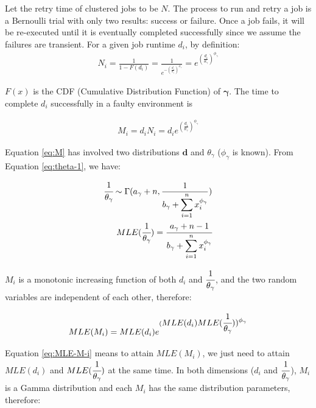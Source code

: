 \documentclass{IOS-Book-Article}
\begin{document}
Let the retry time of clustered jobs to be $N$. The process to run and retry a job is a Bernoulli trial with only two results: success or failure. Once a job fails, it will be re-executed until it is eventually completed successfully since we assume the failures are transient. For a given job runtime $d_i$, by definition:
\begin{eqnarray}
\displaystyle
N_i=\frac{1}{1-F(d_i)}=\frac{1}{e^{-(\displaystyle\frac{d_i}{\theta_{\gamma}})^{\phi_{\gamma}}}}=e^{(\displaystyle\frac{d_i}{\theta_{\gamma}})^{\phi_{\gamma}}} 
\label{eq:N}
\end{eqnarray}

$F(x)$ is the CDF (Cumulative Distribution Function) of $\bm\gamma$. The time to complete $d_i$ successfully in a faulty environment is

\begin{eqnarray}
\displaystyle
M_i=d_iN_i=d_ie^{(\displaystyle\frac{d_i}{\theta_{\gamma}})^{\phi_{\gamma}}} 
\label{eq:M}
\end{eqnarray}

Equation \ref{eq:M} has involved two distributions $\bm d$ and $\theta_{\gamma}$ ($\phi_{\gamma}$ is known). From Equation \ref{eq:theta-1}, we have:

\begin{eqnarray}
\displaystyle\cfrac{1}{\theta_{\gamma}}\sim\Gamma(a_{\gamma}+n,\frac{1}{\displaystyle b_{\gamma}+\sum_{i=1}^n{x_i^{\phi_{\gamma}}}}) \\
MLE(\displaystyle\cfrac{1}{\theta_{\gamma}})=\displaystyle\cfrac{a_{\gamma}+n-1}{\displaystyle b_{\gamma}+\sum_{i=1}^n{x_i^{\phi_{\gamma}}}}
\label{eq:theta}
 \end{eqnarray}

$M_i$ is a monotonic increasing function of both $d_i$ and $\displaystyle\cfrac{1}{\theta_{\gamma}}$, and the two random variables are independent of each other, therefore:


\begin{equation} 
\label{eq:MLE-M-i}
MLE(M_i)=MLE(d_i)e^{(\displaystyle MLE(d_i)MLE(\cfrac{1}{\theta_{\gamma}}))^{\phi_{\gamma}}} 
\end{equation}

Equation \ref{eq:MLE-M-i} means to attain $MLE(M_i)$, we just need to attain $MLE(d_i)$ and $MLE(\cfrac{1}{\theta_{\gamma}})$ at the same time. 
In both dimensions ($d_i$ and $\displaystyle\cfrac{1}{\theta_{\gamma}}$), $M_i$ is a Gamma distribution and each $M_i$ has the same distribution parameters, therefore:
\end{document}
